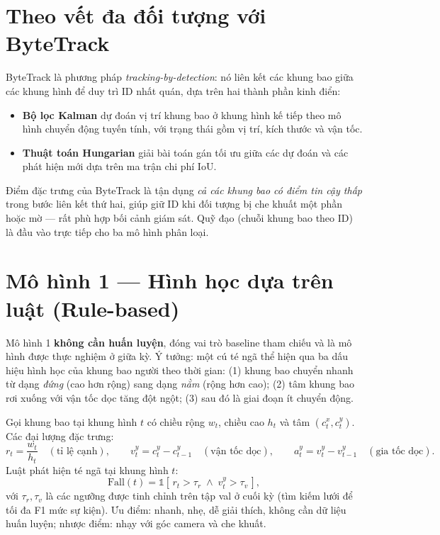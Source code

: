 \documentclass[fontsize=13pt,a4paper,oneside,DIV=calc,chapterprefix=true]{scrbook}
\begin{document}
\section{Theo vết đa đối tượng với ByteTrack}
ByteTrack \cite{bytetrack} là phương pháp \textit{tracking-by-detection}: nó liên kết các khung bao giữa các khung hình để duy trì ID nhất quán, dựa trên hai thành phần kinh điển:
\begin{itemize}[leftmargin=1.2cm]
    \item \textbf{Bộ lọc Kalman} dự đoán vị trí khung bao ở khung hình kế tiếp theo mô hình chuyển động tuyến tính, với trạng thái gồm vị trí, kích thước và vận tốc.
    \item \textbf{Thuật toán Hungarian} giải bài toán gán tối ưu giữa các dự đoán và các phát hiện mới dựa trên ma trận chi phí IoU.
\end{itemize}
Điểm đặc trưng của ByteTrack là tận dụng \emph{cả các khung bao có điểm tin cậy thấp} trong bước liên kết thứ hai, giúp giữ ID khi đối tượng bị che khuất một phần hoặc mờ --- rất phù hợp bối cảnh giám sát. Quỹ đạo (chuỗi khung bao theo ID) là đầu vào trực tiếp cho ba mô hình phân loại.

\section{Mô hình 1 --- Hình học dựa trên luật (Rule-based)}
Mô hình 1 \textbf{không cần huấn luyện}, đóng vai trò baseline tham chiếu và là mô hình được thực nghiệm ở giữa kỳ. Ý tưởng: một cú té ngã thể hiện qua ba dấu hiệu hình học của khung bao người theo thời gian: (1) khung bao chuyển nhanh từ dạng \emph{đứng} (cao hơn rộng) sang dạng \emph{nằm} (rộng hơn cao); (2) tâm khung bao rơi xuống với vận tốc dọc tăng đột ngột; (3) sau đó là giai đoạn ít chuyển động.

Gọi khung bao tại khung hình $t$ có chiều rộng $w_t$, chiều cao $h_t$ và tâm $(c^x_t, c^y_t)$. Các đại lượng đặc trưng:
\begin{equation}
r_t = \frac{w_t}{h_t} \quad (\text{tỉ lệ cạnh}), \qquad
v^y_t = c^y_t - c^y_{t-1} \quad (\text{vận tốc dọc}), \qquad
a^y_t = v^y_t - v^y_{t-1} \quad (\text{gia tốc dọc}).
\end{equation}
Luật phát hiện té ngã tại khung hình $t$:
\begin{equation}
\mathrm{Fall}(t) = \mathbb{1}\!\left[\, r_t > \tau_r \;\wedge\; v^y_t > \tau_v \,\right],
\end{equation}
với $\tau_r, \tau_v$ là các ngưỡng được tinh chỉnh trên tập val ở cuối kỳ (tìm kiếm lưới để tối đa F1 mức sự kiện). Ưu điểm: nhanh, nhẹ, dễ giải thích, không cần dữ liệu huấn luyện; nhược điểm: nhạy với góc camera và che khuất.
\end{document}
